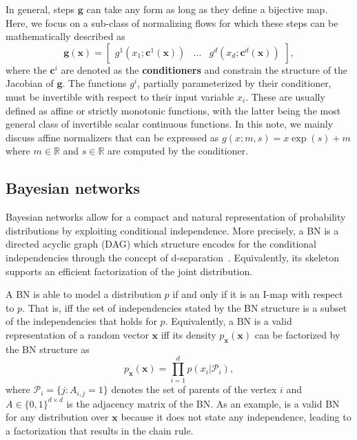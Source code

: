In general, steps $\mathbf{g}$ can take any form as long as they define a bijective map. Here, we focus on a sub-class of normalizing flows for which these steps can be mathematically described as
\begin{equation*}
    \mathbf{g}(\mathbf{x}) = \begin{bmatrix}
g^1(x_{1}; \mathbf{c}^1(\mathbf{x})) & \hdots & g^d(x_{d}; \mathbf{c}^d(\mathbf{x}))
\end{bmatrix},\label{eq:gnf}
\end{equation*}
where the $\mathbf{c}^i$ are denoted as the \textbf{conditioners} and constrain the structure of the Jacobian of $\mathbf{g}$. The functions $g^i$, partially parameterized by their conditioner, must be invertible with respect to their input variable $x_i$. These are usually defined as affine or strictly monotonic functions, with the latter being the most general class of invertible scalar continuous functions.
In this note, we mainly discuss affine normalizers that can be expressed as
$g(x;m, s) = x\exp(s) + m$
where $m \in \mathbb{R}$ and $s \in \mathbb{R}$ are computed by the conditioner.



\subsection{Bayesian networks}

Bayesian networks allow for a compact and natural representation of probability distributions by exploiting conditional independence. More precisely, a BN is a directed acyclic graph (DAG) which structure encodes for the conditional independencies through the concept of d-separation~\citep{geiger_d-separation_1990}. Equivalently, its skeleton supports an efficient factorization of the joint distribution.

A BN is able to model a distribution $p$ if and only if it is an I-map with respect to $p$. That is, iff the set of independencies stated by the BN structure is a subset of the independencies that holds for $p$. Equivalently, a BN is a valid representation of a random vector $\mathbf{x}$ iff its density $p_{\mathbf{x}}(\mathbf{x})$ can be factorized by the BN structure as
\begin{equation}
    p_{\mathbf{x}}(\mathbf{x}) = \prod^d_{i=1}p(x_i|\mathcal{P}_i),\label{eq:BN-fact}
\end{equation}
where  $\mathcal{P}_i = \{j: A_{i,j} = 1 \}$ denotes the set of parents of the vertex $i$ and $A \in \{0, 1\}^{d\times d}$ is the adjacency matrix of the BN. As an example,  is a valid BN for any distribution over $\mathbf{x}$ because it does not state any independence, leading to a factorization that results in the chain rule.



